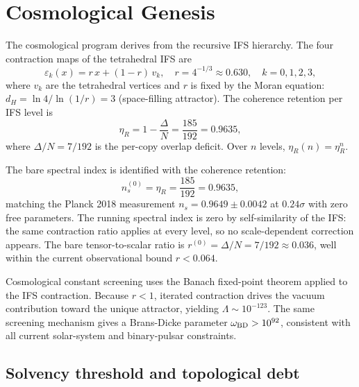 \documentclass[11pt,twocolumn]{article}
\begin{document}
\section{Cosmological Genesis}
\label{sec:cosmo}

The cosmological program derives from the recursive IFS hierarchy.
The four contraction maps of the tetrahedral IFS are\cite{hutchinson}
\begin{equation}
\label{eq:ifs}
\varepsilon_k(x) = r\,x + (1-r)\,v_k, \quad r = 4^{-1/3} \approx 0.630, \quad k = 0,1,2,3,
\end{equation}
where $v_k$ are the tetrahedral vertices and $r$ is fixed by the Moran equation: $d_H = \ln 4 / \ln(1/r) = 3$ (space-filling attractor).\cite{falconer}
The coherence retention per IFS level is
\begin{equation}
\label{eq:eta}
\eta_R = 1 - \frac{\Delta}{N} = \frac{185}{192} = 0.9635,
\end{equation}
where $\Delta/N = 7/192$ is the per-copy overlap deficit.
Over $n$ levels, $\eta_R(n) = \eta_R^n$.

The bare spectral index is identified with the coherence retention:\cite{planck2018}
\begin{equation}
\label{eq:ns}
n_s^{(0)} = \eta_R = \frac{185}{192} = 0.9635,
\end{equation}
matching the Planck 2018 measurement $n_s = 0.9649 \pm 0.0042$ at $0.24\sigma$ with zero free parameters.
The running spectral index is zero by self-similarity of the IFS:\cite{akiyama} the same contraction ratio applies at every level, so no scale-dependent correction appears.
The bare tensor-to-scalar ratio is $r^{(0)} = \Delta/N = 7/192 \approx 0.036$, well within the current observational bound $r < 0.064$.

Cosmological constant screening uses the Banach fixed-point theorem applied to the IFS contraction.
Because $r < 1$, iterated contraction drives the vacuum contribution toward the unique attractor, yielding $\Lambda \sim 10^{-123}$.\cite{bransdicke}
The same screening mechanism gives a Brans-Dicke parameter $\omega_{\rm BD} > 10^{92}$, consistent with all current solar-system and binary-pulsar constraints.\cite{appelquist}

\subsection{Solvency threshold and topological debt}
\label{sec:solvency}
\end{document}
